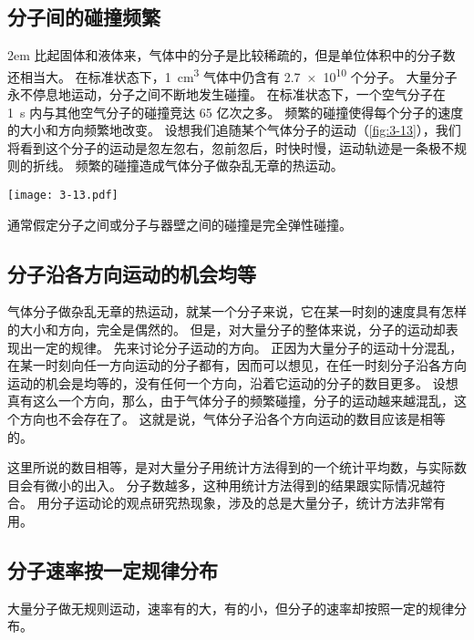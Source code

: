 \subsection{分子间的碰撞频繁} 
\medskip\noindent
\begin{minipage}{0.57\linewidth}\parindent2em
比起固体和液体来，气体中的分子是比较稀疏的，但是单位体积中的分子数还相当大。
在标准状态下，\qty{1}{cm^3} 气体中仍含有 \num{2.7e10} 个分子。
大量分子永不停息地运动，分子之间不断地发生碰撞。
在标准状态下，一个空气分子在 \qty{1}{s} 内与其他空气分子的碰撞竞达 65 亿次之多。
频繁的碰撞使得每个分子的速度的大小和方向频繁地改变。
设想我们追随某个气体分子的运动（\cref{fig:3-13}），我们将看到这个分子的运动是忽左忽右，忽前忽后，时快时慢，运动轨迹是一条极不规则的折线。
频繁的碰撞造成气体分子做杂乱无章的热运动。
\end{minipage}\hfill
\begin{minipage}{0.38\linewidth}
\begin{figurehere}
	\texttt{[image: 3-13.pdf]}
	\caption{}\label{fig:3-13}
\end{figurehere}
\end{minipage}

\medskip
通常假定分子之间或分子与器壁之间的碰撞是完全弹性碰撞。

\subsection{分子沿各方向运动的机会均等} 

气体分子做杂乱无章的热运动，就某一个分子来说，它在某一时刻的速度具有怎样的大小和方向，完全是偶然的。
但是，对大量分子的整体来说，分子的运动却表现出一定的规律。
先来讨论分子运动的方向。
正因为大量分子的运动十分混乱，在某一时刻向任一方向运动的分子都有，因而可以想见，在任一时刻分子沿各方向运动的机会是均等的，没有任何一个方向，沿着它运动的分子的数目更多。
设想真有这么一个方向，那么，由于气体分子的频繁碰撞，分子的运动越来越混乱，这个方向也不会存在了。
这就是说，气体分子沿各个方向运动的数目应该是相等的。

这里所说的数目相等，是对大量分子用统计方法得到的一个统计平均数，与实际数目会有微小的出入。
分子数越多，这种用统计方法得到的结果跟实际情况越符合。
用分子运动论的观点研究热现象，涉及的总是大量分子，统计方法非常有用。

\subsection{分子速率按一定规律分布} 
大量分子做无规则运动，速率有的大，有的小，但分子的速率却按照一定的规律分布。

